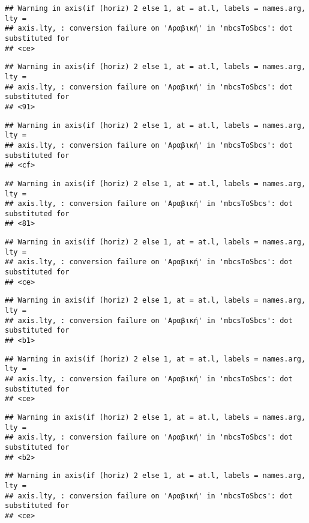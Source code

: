 \documentclass[
]{article}
\begin{document}
\begin{verbatim}
## Warning in axis(if (horiz) 2 else 1, at = at.l, labels = names.arg, lty =
## axis.lty, : conversion failure on 'Αραβική' in 'mbcsToSbcs': dot substituted for
## <ce>
\end{verbatim}

\begin{verbatim}
## Warning in axis(if (horiz) 2 else 1, at = at.l, labels = names.arg, lty =
## axis.lty, : conversion failure on 'Αραβική' in 'mbcsToSbcs': dot substituted for
## <91>
\end{verbatim}

\begin{verbatim}
## Warning in axis(if (horiz) 2 else 1, at = at.l, labels = names.arg, lty =
## axis.lty, : conversion failure on 'Αραβική' in 'mbcsToSbcs': dot substituted for
## <cf>
\end{verbatim}

\begin{verbatim}
## Warning in axis(if (horiz) 2 else 1, at = at.l, labels = names.arg, lty =
## axis.lty, : conversion failure on 'Αραβική' in 'mbcsToSbcs': dot substituted for
## <81>
\end{verbatim}

\begin{verbatim}
## Warning in axis(if (horiz) 2 else 1, at = at.l, labels = names.arg, lty =
## axis.lty, : conversion failure on 'Αραβική' in 'mbcsToSbcs': dot substituted for
## <ce>
\end{verbatim}

\begin{verbatim}
## Warning in axis(if (horiz) 2 else 1, at = at.l, labels = names.arg, lty =
## axis.lty, : conversion failure on 'Αραβική' in 'mbcsToSbcs': dot substituted for
## <b1>
\end{verbatim}

\begin{verbatim}
## Warning in axis(if (horiz) 2 else 1, at = at.l, labels = names.arg, lty =
## axis.lty, : conversion failure on 'Αραβική' in 'mbcsToSbcs': dot substituted for
## <ce>
\end{verbatim}

\begin{verbatim}
## Warning in axis(if (horiz) 2 else 1, at = at.l, labels = names.arg, lty =
## axis.lty, : conversion failure on 'Αραβική' in 'mbcsToSbcs': dot substituted for
## <b2>
\end{verbatim}

\begin{verbatim}
## Warning in axis(if (horiz) 2 else 1, at = at.l, labels = names.arg, lty =
## axis.lty, : conversion failure on 'Αραβική' in 'mbcsToSbcs': dot substituted for
## <ce>
\end{verbatim}
\end{document}
